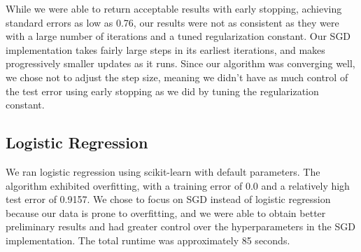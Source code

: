\documentclass[journal]{IEEEtran}
\begin{document}
While we were able to return acceptable results with early stopping, achieving standard errors as low as 0.76, our results were not as consistent as they were with a large number of iterations and a tuned regularization constant.  Our SGD implementation takes fairly large steps in its earliest iterations, and makes progressively smaller updates as it runs.  Since our algorithm was converging well, we chose not to adjust the step size, meaning we didn't have as much control of the test error using early stopping as we did by tuning the regularization constant.

\subsection{Logistic Regression}

We ran logistic regression using scikit-learn with default parameters.  The algorithm exhibited overfitting, with a training error of 0.0 and a relatively high test error of 0.9157.  We chose to focus on SGD instead of logistic regression because our data is prone to overfitting, and we were able to obtain better preliminary results and had greater control over the hyperparameters in the SGD implementation.  The total runtime was approximately 85 seconds.
\end{document}
